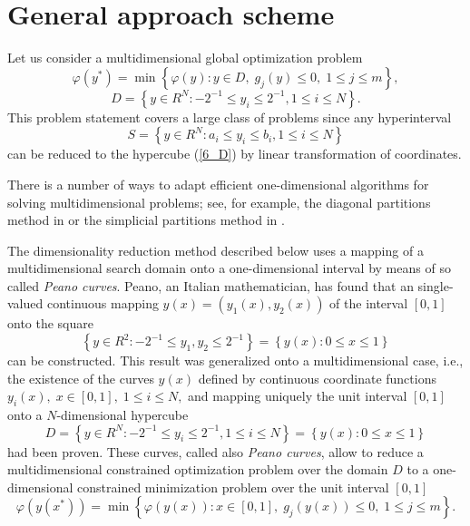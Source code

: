 
\section{General approach scheme}

Let us consider a multidimensional global optimization problem
\begin{equation}\label{6_problem} 
\varphi(y^\ast)=\min{\left\{\varphi(y):y\in D, \; g_j(y)\leq 0, \; 1 \leq j \leq m\right\}},
\end{equation} 
\begin{equation}\label{6_D}
D=\left\{y\in R^N: -2^{-1}\leq y_i \leq 2^{-1}, 1\leq i \leq N \right\}.
\end{equation}
This problem statement covers a large class of problems since any hyperinterval 
\[
S=\left\{y\in R^N: a_i\leq y_i \leq b_i, 1\leq i \leq N\right\}
\]
can be reduced to the  hypercube (\ref{6_D}) by linear transformation of coordinates.

There is a number of ways to adapt efficient one-dimensional algorithms for solving multidimensional problems; see, for example, the diagonal partitions method in \cite{6_Sergeyev2006,6_Sergeyev2015,6_Sergeyev2017} or the simplicial partitions method in \cite{6_Zilinskas2008,6_Zilinskas2014,6_Zilinskas2014_1}. 

The dimensionality reduction method described below uses a mapping of a multidimensional search domain onto a one-dimensional interval by means of so called \textit{Peano curves}. Peano, an Italian mathematician, has found that an single-valued continuous mapping $y(x)=(y_1(x),y_2(x))$ of the interval $[0,1]$ onto the square 
\[
\left\{y\in R^2: -2^{-1}\leq y_1,y_2 \leq 2^{-1} \right\} = \left\{ y(x): 0 \leq x \leq 1 \right\}
\]
can be constructed.
This result was generalized onto a multidimensional case, i.e., the existence of the curves $y(x)$ defined by continuous coordinate functions $y_i(x), \; x \in [0,1],\; 1 \leq i \leq N,$ and mapping uniquely the unit interval $[0,1]$ onto a $N$-dimensional hypercube 
\[
D=\left\{y\in R^N: -2^{-1}\leq y_i \leq 2^{-1}, 1\leq i \leq N \right\} = \left\{ y(x): 0 \leq x \leq 1 \right\}
\]
had been proven. These curves, called also \textit{Peano curves}, allow to reduce a multidimensional constrained optimization problem over the domain $D$ to a one-dimensional constrained minimization problem over the unit interval $[0,1]$
\begin{equation}\label{6_problem_1} 
\varphi(y(x^\ast))=\min{\left\{\varphi(y(x)):x\in [0,1], \; g_j(y(x))\leq 0, \; 1 \leq j \leq m\right\}}.
\end{equation} 

